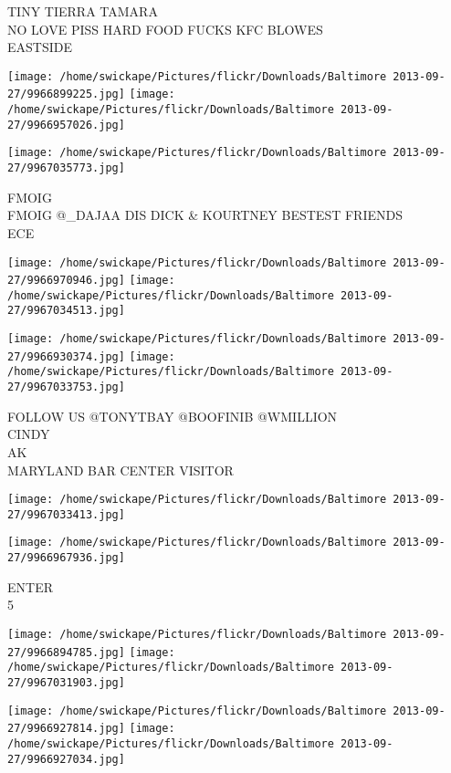 \documentclass[10pt,letterpaper]{article}
\begin{document}
TINY TIERRA TAMARA\\
NO LOVE PISS HARD FOOD FUCKS KFC BLOWES\\
EASTSIDE
\pagebreak

\texttt{[image: /home/swickape/Pictures/flickr/Downloads/Baltimore 2013-09-27/9966899225.jpg]}
\texttt{[image: /home/swickape/Pictures/flickr/Downloads/Baltimore 2013-09-27/9966957026.jpg]}

\vspace{0.25in}
\texttt{[image: /home/swickape/Pictures/flickr/Downloads/Baltimore 2013-09-27/9967035773.jpg]}

FMOIG\\
FMOIG @\_DAJAA DIS DICK \& KOURTNEY BESTEST FRIENDS\\
ECE
\pagebreak

\texttt{[image: /home/swickape/Pictures/flickr/Downloads/Baltimore 2013-09-27/9966970946.jpg]}
\texttt{[image: /home/swickape/Pictures/flickr/Downloads/Baltimore 2013-09-27/9967034513.jpg]}

\texttt{[image: /home/swickape/Pictures/flickr/Downloads/Baltimore 2013-09-27/9966930374.jpg]}
\texttt{[image: /home/swickape/Pictures/flickr/Downloads/Baltimore 2013-09-27/9967033753.jpg]}

FOLLOW US @TONYTBAY @BOOFINIB @WMILLION\\
CINDY\\
AK\\
MARYLAND BAR CENTER VISITOR
\pagebreak

\texttt{[image: /home/swickape/Pictures/flickr/Downloads/Baltimore 2013-09-27/9967033413.jpg]}

\vspace{0.25in}
\texttt{[image: /home/swickape/Pictures/flickr/Downloads/Baltimore 2013-09-27/9966967936.jpg]}

ENTER\\
5
\pagebreak

\texttt{[image: /home/swickape/Pictures/flickr/Downloads/Baltimore 2013-09-27/9966894785.jpg]}
\texttt{[image: /home/swickape/Pictures/flickr/Downloads/Baltimore 2013-09-27/9967031903.jpg]}

\texttt{[image: /home/swickape/Pictures/flickr/Downloads/Baltimore 2013-09-27/9966927814.jpg]}
\texttt{[image: /home/swickape/Pictures/flickr/Downloads/Baltimore 2013-09-27/9966927034.jpg]}
\end{document}
